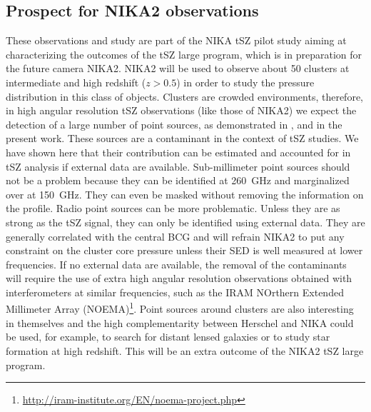 \documentclass[twocolumn,traditabstract]{aa}
\begin{document}
\subsection{Prospect for NIKA2 observations}
These observations and study are part of the NIKA tSZ pilot study aiming at characterizing the outcomes of the tSZ large program, which is in preparation for the future camera NIKA2. NIKA2 will be used to observe about 50 clusters at intermediate and high redshift ($z>0.5$) in order to study the pressure distribution in this class of objects. Clusters are crowded environments, therefore, in high angular resolution tSZ observations (like those of NIKA2) we expect the detection of a large number of point sources, as demonstrated in \cite{adam2013}, \cite{adam2014} and in the present work. These sources are a contaminant in the context of tSZ studies. We have shown here that their contribution can be estimated and accounted for in tSZ analysis if external data are available. Sub-millimeter point sources should not be a problem because they can be identified at 260~GHz and marginalized over at 150~GHz. They can even be masked without removing the information on the profile. Radio point sources can be more problematic. Unless they are as strong as the tSZ signal, they can only be identified using external data. They are generally correlated with the central BCG and will refrain NIKA2 to put any constraint on the cluster core pressure unless their SED is well measured at lower frequencies. If no external data are available, the removal of the contaminants will require the use of extra high angular resolution observations obtained with interferometers at similar frequencies, such as the IRAM NOrthern Extended Millimeter Array (NOEMA)\footnote{\url{http://iram-institute.org/EN/noema-project.php}}. Point sources around clusters are also interesting in themselves and the high complementarity between Herschel and NIKA could be used, for example, to search for distant lensed galaxies \citep[see for example][]{egami2010} or to study star formation at high redshift. This will be an extra outcome of the NIKA2 tSZ large program.
\end{document}
